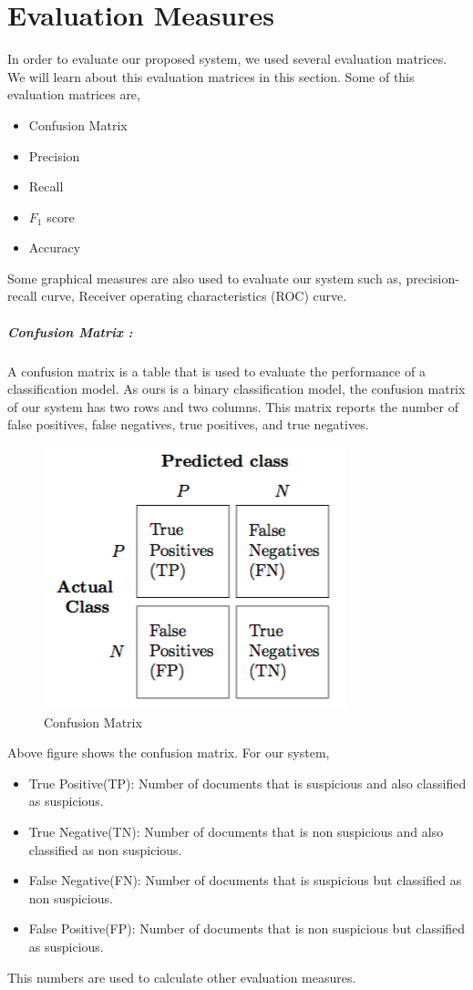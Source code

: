 \documentclass[12pt,a4paper]{report}
\begin{document}
\section{Evaluation Measures}
In order to evaluate our proposed system, we used several evaluation matrices. We will learn about this  evaluation matrices in this section. Some of this evaluation matrices are,
\begin{itemize}
    \item Confusion Matrix
    \item Precision
    \item Recall
    \item $F_1$ score
    \item Accuracy 
\end{itemize}
Some graphical measures are also used to evaluate our system such as, precision-recall curve, Receiver operating characteristics (ROC) curve.
\clearpage
\subparagraph{Confusion Matrix :}
A confusion matrix is a table that is used to evaluate the performance of a classification model. As ours is a binary classification model, the confusion matrix of our system has two rows and two columns. This matrix reports the number of false positives, false negatives, true positives, and true negatives.

\begin{figure}[h!]
    \centering
    \includegraphics[scale=0.55]{Figures/confusion_matrix_1.png}
    \caption{Confusion Matrix}
    \label{fig:CM}
\end{figure}
\noindent
Above figure shows the confusion matrix. For our system,
\begin{itemize}
    \item True Positive(TP): Number of documents that is suspicious and also classified as suspicious.
    \item True Negative(TN): Number of documents that is non suspicious and also classified as non suspicious.
    \item False Negative(FN): Number of documents that is suspicious but classified as non suspicious.
    \item False Positive(FP): Number of documents that is non suspicious but classified as suspicious. 
\end{itemize}
\noindent
This numbers are used to calculate other evaluation measures.
\end{document}

